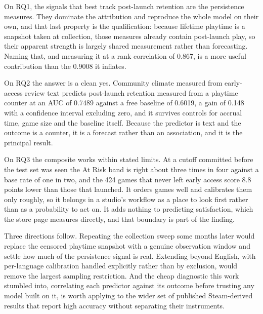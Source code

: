 \documentclass[sigconf]{acmart}
\begin{document}
On RQ1, the signals that best track post-launch retention are the persistence measures. They
dominate the attribution and reproduce the whole model on their own, and that last property is the
qualification: because lifetime playtime is a snapshot taken at collection, those measures already
contain post-launch play, so their apparent strength is largely shared measurement rather than
forecasting. Naming that, and measuring it at a rank correlation of 0.867, is a more useful
contribution than the 0.9008 it inflates.

On RQ2 the answer is a clean yes. Community climate measured from early-access review text predicts
post-launch retention measured from a playtime counter at an AUC of 0.7489 against a free baseline
of 0.6019, a gain of 0.148 with a confidence interval excluding zero, and it survives controls for
accrual time, game size and the baseline itself. Because the predictor is text and the outcome is a
counter, it is a forecast rather than an association, and it is the principal result.

On RQ3 the composite works within stated limits. At a cutoff committed before the test set was seen
the At Risk band is right about three times in four against a base rate of one in two, and the 424
games that never left early access score 8.8 points lower than those that launched. It orders games
well and calibrates them only roughly, so it belongs in a studio's workflow as a place to look
first rather than as a probability to act on. It adds nothing to predicting satisfaction, which the
store page measures directly, and that boundary is part of the finding.

Three directions follow. Repeating the collection sweep some months later would replace the
censored playtime snapshot with a genuine observation window and settle how much of the persistence
signal is real. Extending beyond English, with per-language calibration handled explicitly rather
than by exclusion, would remove the largest sampling restriction. And the cheap diagnostic this work
stumbled into, correlating each predictor against its outcome before trusting any model built on
it, is worth applying to the wider set of published Steam-derived results that report high accuracy
without separating their instruments.




\end{document}
